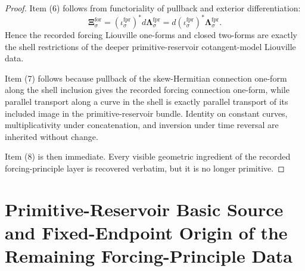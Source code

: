 \documentclass[11pt]{article}
\newcommand{\ForTwo}[1]{\boldsymbol{\Xi}_{#1}^{\mathrm{for}}}
\newcommand{\ForPrimInc}[1]{\iota_{#1}^{\mathrm{fpr}}}
\newcommand{\ForPrimLiouville}[1]{\boldsymbol{\Lambda}_{#1}^{\mathrm{fpr}}}
\begin{document}
\begin{proof}
Item (6) follows from functoriality of pullback and exterior differentiation:
\[
\ForTwo{\sigma}
=
(\ForPrimInc{\sigma})^*d\ForPrimLiouville{\sigma}
=
d(\ForPrimInc{\sigma})^*\ForPrimLiouville{\sigma}.
\]
Hence the recorded forcing Liouville one-forms and closed two-forms are exactly the shell restrictions of the deeper primitive-reservoir cotangent-model Liouville data.

Item (7) follows because pullback of the skew-Hermitian connection one-form along the shell inclusion gives the recorded forcing connection one-form, while parallel transport along a curve in the shell is exactly parallel transport of its included image in the primitive-reservoir bundle. Identity on constant curves, multiplicativity under concatenation, and inversion under time reversal are inherited without change.

Item (8) is then immediate. Every visible geometric ingredient of the recorded forcing-principle layer is recovered verbatim, but it is no longer primitive.
\end{proof}

\section{Primitive-Reservoir Basic Source and Fixed-Endpoint Origin of the Remaining Forcing-Principle Data}
\end{document}
